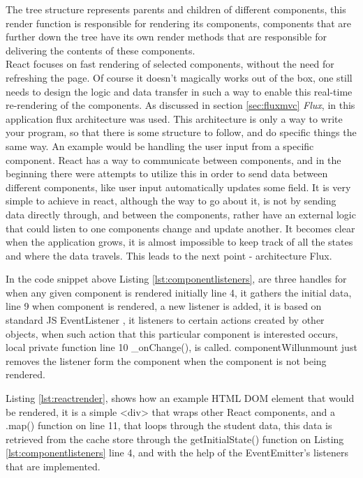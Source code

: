 The tree structure represents parents and children of different components, this render function is responsible for rendering its components, components that are further down the tree have its own render methods that are responsible for delivering the contents of these components.
\\React focuses on fast rendering of selected components, without the need for refreshing the page. Of course it doesn't magically works out of the box, one still needs to design the logic and data transfer in such a way to enable this real-time re-rendering of the components. As discussed in section \ref{sec:fluxmvc} \emph{Flux}, in this application flux architecture was used. This architecture is only a way to write your program, so that there is some structure to follow, and do specific things the same way. An example would be handling the user input from a specific component. React has a way to communicate between components, and in the beginning there were attempts to utilize this in order to send data between different components, like user input automatically updates some field. It is very simple to achieve in react, although the way to go about it, is not by sending data directly through, and between the components, rather have an external logic that could listen to one components change and update another. It becomes clear when the application grows, it is almost impossible to keep track of all the states and where the data travels. This leads to the next point - architecture Flux.



In the code snippet above Listing \ref{lst:componentlisteners}, are three handles for when any given component  is rendered initially line 4, it gathers the initial data, line 9 when component is rendered, a new listener is added, it is based on standard JS EventListener \cite{eventlistener}, it listeners to certain actions created by other objects, when such action that this particular component is interested occurs, local private function line 10 \_onChange(), is called. componentWillunmount just removes the listener form the component when the component is not being rendered.




Listing \ref{lst:reactrender}, shows how an example HTML DOM element that would be rendered, it is a simple <div> that wraps other React components, and a .map() function on line 11, that loops through the student data, this data is retrieved from the cache store through the getInitialState() function on Listing \ref{lst:componentlisteners} line 4, and with the help of the EventEmitter's listeners that are implemented.

